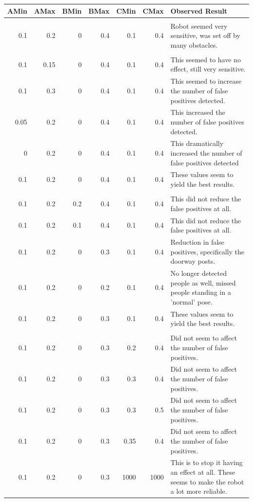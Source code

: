 \documentclass{article}
\begin{document}
\begin{longtable}{r|r|r|r|r|r|p{8cm}}
AMin & AMax & BMin & BMax & CMin & CMax & Observed Result\\
\hline
 & & & & & & \\

0.1 & 0.2 & 0 & 0.4 & 0.1 & 0.4 & Robot seemed very sensitive, was set off by many obstacles.\\

 & & & & & & \\
 0.1 & 0.15 & 0 & 0.4 & 0.1 & 0.4 & This seemed to have no effect, still very sensitive.\\[1ex]
 0.1 & 0.3 & 0 & 0.4 & 0.1 & 0.4 & This seemed to increase the number of false positives detected.\\
 0.05 & 0.2 & 0 & 0.4 & 0.1 & 0.4 & This increased the number of false positives detected.\\[1ex]
 0 & 0.2 & 0 & 0.4 & 0.1 & 0.4 & This dramatically increased the number of false positives detected\\
 0.1 & 0.2 & 0 & 0.4 & 0.1 & 0.4 & These values seem to yield the best results.\\ [1ex]
 & & & & & & \\ 
 0.1 & 0.2 & 0.2 & 0.4 & 0.1 & 0.4 & This did not reduce the false positives at all.\\[1ex]
 0.1 & 0.2 & 0.1 & 0.4 & 0.1 & 0.4 & This did not reduce the false positives at all.\\[1ex]
 0.1 & 0.2 & 0 & 0.3 & 0.1 & 0.4 & Reduction in false positives, specifically the doorway posts.\\
 0.1 & 0.2 & 0 & 0.2 & 0.1 & 0.4 & No longer detected people as well, missed people standing in a 'normal' pose.\\
 0.1 & 0.2 & 0 & 0.3 & 0.1 & 0.4 & These values seem to yield the best results.\\ [1ex]
 & & & & & & \\
 0.1 & 0.2 & 0 & 0.3 & 0.2 & 0.4 & Did not seem to affect the number of false positives.\\[1ex]
 0.1 & 0.2 & 0 & 0.3 & 0.3 & 0.4 & Did not seem to affect the number of false positives.\\[1ex]
 0.1 & 0.2 & 0 & 0.3 & 0.3 & 0.5 & Did not seem to affect the number of false positives.\\[1ex]
 0.1 & 0.2 & 0 & 0.3 & 0.35 & 0.4 & Did not seem to affect the number of false positives.\\[1ex]
 
 0.1 & 0.2 & 0 & 0.3 & 1000 & 1000 & This is to stop it having an effect at all. These seems to make the robot a lot more reliable.\\
 \end{longtable}
\end{document}

